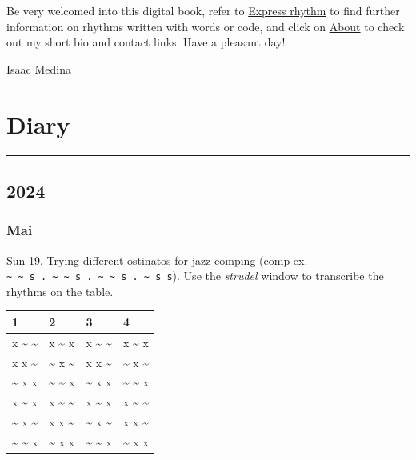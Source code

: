 \documentclass[
]{book}
\begin{document}
Be very welcomed into this digital book, refer to \hyperref[Express-rhythm]{Express rhythm} to find further information on rhythms written with words or code, and click on \hyperref[About]{About} to check out my short bio and contact links. Have a pleasant day!

Isaac Medina

\chapter{Diary}\label{Diary}

\begin{center}\rule{0.5\linewidth}{0.5pt}\end{center}

\section*{2024}\label{diary-2024}

\subsection*{Mai}\label{mai-2024}

Sun 19. Trying different ostinatos for jazz comping (comp ex. \texttt{\textasciitilde{}\ \textasciitilde{}\ s\ .\ \textasciitilde{}\ \textasciitilde{}\ s\ .\ \textasciitilde{}\ \textasciitilde{}\ s\ .\ \textasciitilde{}\ s\ s}). Use the \emph{strudel} window to transcribe the rhythms on the table.

\begin{longtable}[]{@{}llll@{}}
\toprule\noalign{}
1 & 2 & 3 & 4 \\
\midrule\noalign{}
\endhead
\bottomrule\noalign{}
\endlastfoot
x \textasciitilde{} \textasciitilde{} & x \textasciitilde{} x & x \textasciitilde{} \textasciitilde{} & x \textasciitilde{} x \\
x x \textasciitilde{} & \textasciitilde{} x \textasciitilde{} & x x \textasciitilde{} & \textasciitilde{} x \textasciitilde{} \\
\textasciitilde{} x x & \textasciitilde{} \textasciitilde{} x & \textasciitilde{} x x & \textasciitilde{} \textasciitilde{} x \\
x \textasciitilde{} x & x \textasciitilde{} \textasciitilde{} & x \textasciitilde{} x & x \textasciitilde{} \textasciitilde{} \\
\textasciitilde{} x \textasciitilde{} & x x \textasciitilde{} & \textasciitilde{} x \textasciitilde{} & x x \textasciitilde{} \\
\textasciitilde{} \textasciitilde{} x & \textasciitilde{} x x & \textasciitilde{} \textasciitilde{} x & \textasciitilde{} x x \\
\end{longtable}
\end{document}
